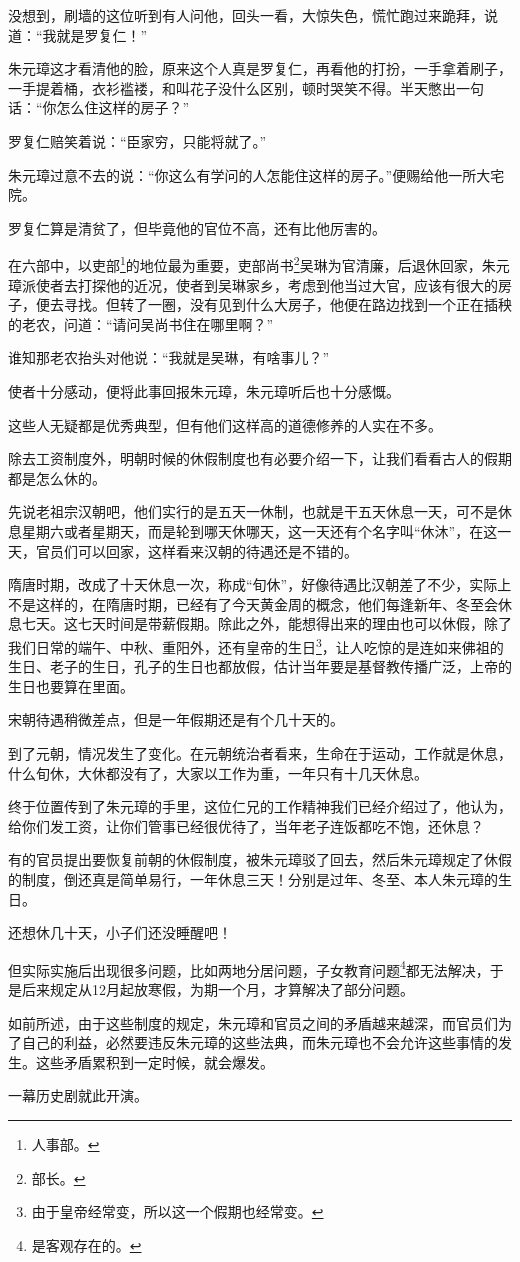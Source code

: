 \begin{multicols}{\theparacolNo}
		没想到，刷墙的这位听到有人问他，回头一看，大惊失色，慌忙跑过来跪拜，说道：“我就是罗复仁！”

		朱元璋这才看清他的脸，原来这个人真是罗复仁，再看他的打扮，一手拿着刷子，一手提着桶，衣衫褴褛，和叫花子没什么区别，顿时哭笑不得。半天憋出一句话：“你怎么住这样的房子？”

		罗复仁赔笑着说：“臣家穷，只能将就了。”

		朱元璋过意不去的说：“你这么有学问的人怎能住这样的房子。”便赐给他一所大宅院。

		罗复仁算是清贫了，但毕竟他的官位不高，还有比他厉害的。

		在六部中，以吏部\footnote{人事部。}的地位最为重要，吏部尚书\footnote{部长。}吴琳为官清廉，后退休回家，朱元璋派使者去打探他的近况，使者到吴琳家乡，考虑到他当过大官，应该有很大的房子，便去寻找。但转了一圈，没有见到什么大房子，他便在路边找到一个正在插秧的老农，问道：“请问吴尚书住在哪里啊？”

		谁知那老农抬头对他说：“我就是吴琳，有啥事儿？”

		使者十分感动，便将此事回报朱元璋，朱元璋听后也十分感慨。

		这些人无疑都是优秀典型，但有他们这样高的道德修养的人实在不多。

		除去工资制度外，明朝时候的休假制度也有必要介绍一下，让我们看看古人的假期都是怎么休的。

		先说老祖宗汉朝吧，他们实行的是五天一休制，也就是干五天休息一天，可不是休息星期六或者星期天，而是轮到哪天休哪天，这一天还有个名字叫“休沐”，在这一天，官员们可以回家，这样看来汉朝的待遇还是不错的。

		隋唐时期，改成了十天休息一次，称成“旬休”，好像待遇比汉朝差了不少，实际上不是这样的，在隋唐时期，已经有了今天黄金周的概念，他们每逢新年、冬至会休息七天。这七天时间是带薪假期。除此之外，能想得出来的理由也可以休假，除了我们日常的端午、中秋、重阳外，还有皇帝的生日\footnote{由于皇帝经常变，所以这一个假期也经常变。}，让人吃惊的是连如来佛祖的生日、老子的生日，孔子的生日也都放假，估计当年要是基督教传播广泛，上帝的生日也要算在里面。

		宋朝待遇稍微差点，但是一年假期还是有个几十天的。

		到了元朝，情况发生了变化。在元朝统治者看来，生命在于运动，工作就是休息，什么旬休，大休都没有了，大家以工作为重，一年只有十几天休息。

		终于位置传到了朱元璋的手里，这位仁兄的工作精神我们已经介绍过了，他认为，给你们发工资，让你们管事已经很优待了，当年老子连饭都吃不饱，还休息？

		有的官员提出要恢复前朝的休假制度，被朱元璋驳了回去，然后朱元璋规定了休假的制度，倒还真是简单易行，一年休息三天！分别是过年、冬至、本人朱元璋的生日。

		还想休几十天，小子们还没睡醒吧！

		但实际实施后出现很多问题，比如两地分居问题，子女教育问题\footnote{是客观存在的。}都无法解决，于是后来规定从12月起放寒假，为期一个月，才算解决了部分问题。

		如前所述，由于这些制度的规定，朱元璋和官员之间的矛盾越来越深，而官员们为了自己的利益，必然要违反朱元璋的这些法典，而朱元璋也不会允许这些事情的发生。这些矛盾累积到一定时候，就会爆发。

		一幕历史剧就此开演。
		\ifnum{}
	\end{multicols}
